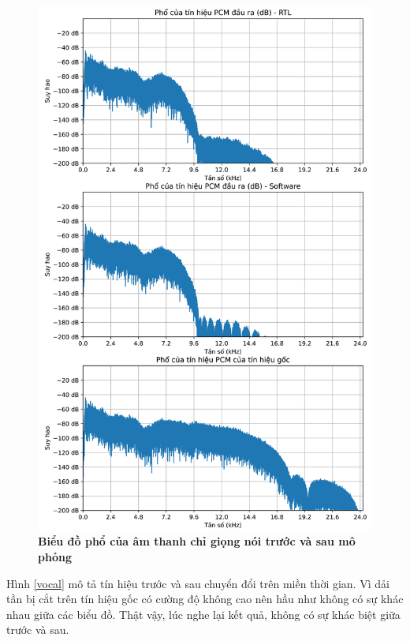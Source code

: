 \begin{figure}[H]
    \centering
    \includegraphics[width=13cm]{Images/Chuong4/tb/wav/vocal_psd.png}
    \caption[Biểu đồ phổ của âm thanh chỉ giọng nói trước và sau mô phỏng]{\bfseries \fontsize{12pt}{0pt}\selectfont  Biểu đồ phổ của âm thanh chỉ giọng nói trước và sau mô phỏng}
    \label{vocal_psd}
\end{figure}

Hình \ref{vocal} mô tả tín hiệu trước và sau chuyển đổi trên miền thời gian. Vì dải tần bị cắt trên tín hiệu gốc có cường độ không cao nên hầu như không có sự khác nhau giữa các biểu đồ. Thật vậy, lúc nghe lại kết quả, không có sự khác biệt giữa trước và sau.

